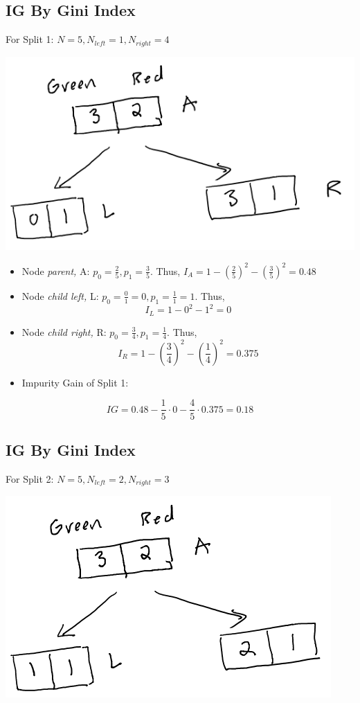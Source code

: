 \documentclass[
]{article}
\begin{document}
\hypertarget{ig-by-gini-index}{%
\subsection{IG By Gini Index}\label{ig-by-gini-index}}

For Split 1: \(N = 5, N_{left} =1, N_{right} = 4\)

\includegraphics{images/im1.png}

\begin{itemize}
\item
  Node \emph{parent,} A: \(p_0 = \frac{2}{5}, p_1 = \frac{3}{5}\). Thus,
  \(I_{A} = 1 - (\frac{2}{5})^2-(\frac{3}{5})^2 = 0.48\)
\item
  Node \emph{child left,} L:
  \(p_0 = \frac{0}{1} = 0, p_1 = \frac{1}{1} = 1\). Thus,
  \[I_{L} = 1 -0^2-1^2 = 0\]
\item
  Node \emph{child right,} R: \(p_0 = \frac{3}{4}, p_1 = \frac{1}{4}\).
  Thus, \[I_{R} = 1-(\frac{3}{4})^2-(\frac{1}{4})^2 = 0.375\]
\item
  Impurity Gain of Split 1:
\end{itemize}

\[IG = 0.48 - \frac{1}{5} \cdot 0-\frac{4}{5} \cdot 0.375 = 0.18\]

\hypertarget{ig-by-gini-index-1}{%
\subsection{IG By Gini Index}\label{ig-by-gini-index-1}}

For Split 2: \(N = 5, N_{left} =2, N_{right} = 3\)

\includegraphics{images/im3.png}
\end{document}
